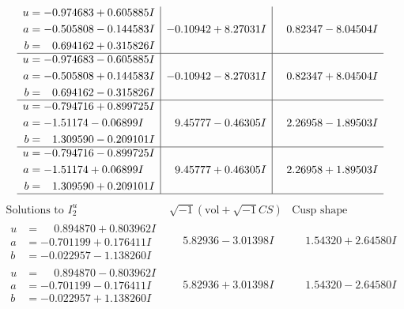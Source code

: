 \documentclass[1p]{elsarticle_modified}
\theoremstyle{definition}
\newcommand{\I}{\sqrt{-1}}
\begin{document}
$$\begin{array}{c|c|c}
\begin{aligned}
u &= -0.974683 + 0.605885 I \\
a &= -0.505808 - 0.144583 I \\
b &= \phantom{-}0.694162 + 0.315826 I\end{aligned}
 & -0.10942 + 8.27031 I & \phantom{-}0.82347 - 8.04504 I \\ \hline\begin{aligned}
u &= -0.974683 - 0.605885 I \\
a &= -0.505808 + 0.144583 I \\
b &= \phantom{-}0.694162 - 0.315826 I\end{aligned}
 & -0.10942 - 8.27031 I & \phantom{-}0.82347 + 8.04504 I \\ \hline\begin{aligned}
u &= -0.794716 + 0.899725 I \\
a &= -1.51174 - 0.06899 I \\
b &= \phantom{-}1.309590 - 0.209101 I\end{aligned}
 & \phantom{-}9.45777 - 0.46305 I & \phantom{-}2.26958 - 1.89503 I \\ \hline\begin{aligned}
u &= -0.794716 - 0.899725 I \\
a &= -1.51174 + 0.06899 I \\
b &= \phantom{-}1.309590 + 0.209101 I\end{aligned}
 & \phantom{-}9.45777 + 0.46305 I & \phantom{-}2.26958 + 1.89503 I\\
 \hline 
 \end{array}$$\newpage$$\begin{array}{c|c|c}  
\text{Solutions to }I^u_{2}& \I (\text{vol} + \sqrt{-1}CS) & \text{Cusp shape}\\
 \hline 
\begin{aligned}
u &= \phantom{-}0.894870 + 0.803962 I \\
a &= -0.701199 + 0.176411 I \\
b &= -0.022957 - 1.138260 I\end{aligned}
 & \phantom{-}5.82936 - 3.01398 I & \phantom{-}1.54320 + 2.64580 I \\ \hline\begin{aligned}
u &= \phantom{-}0.894870 - 0.803962 I \\
a &= -0.701199 - 0.176411 I \\
b &= -0.022957 + 1.138260 I\end{aligned}
 & \phantom{-}5.82936 + 3.01398 I & \phantom{-}1.54320 - 2.64580 I \\ \hline\begin{aligned}

\end{aligned}
\end{array}$$
\end{document}
